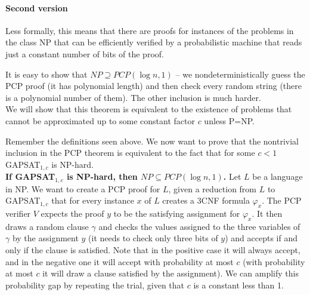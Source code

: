 \paragraph{Second version}

Less formally, this means that there are proofs for instances of the problems in the class NP that can be efficiently verified by a probabilistic machine that reads just a constant number of bits of the proof. 

It is easy to show that $NP \supseteq PCP(\log n, 1)$ -- we nondeterministically guess the PCP proof (it has polynomial length) and then check every random string (there is a polynomial number of them). The other inclusion is much harder.
\\

We will show that this theorem is equivalent to the existence of problems that cannot be approximated up to some constant factor $c$ unless P=NP.

Remember the definitions seen above. We now want to prove that the nontrivial inclusion in the PCP theorem is equivalent to the fact that for some $c<1$ GAPSAT$_{1,c}$ is NP-hard.
\\

{\bf If GAPSAT$_{1,c}$ is NP-hard, then $NP \subseteq PCP(\log n, 1)$.} Let $L$ be a language in NP. We want to create a PCP proof for $L$, given a reduction from $L$ to GAPSAT$_{1,c}$ that for every instance $x$ of $L$ creates a 3CNF formula $\varphi_x$. The PCP verifier $V$ expects the proof $y$ to be the satisfying assignment for $\varphi_x$. It then draws a random clause $\gamma$ and checks the values assigned to the three variables of $\gamma$ by the assignment $y$ (it needs to check only three bits of $y$) and accepts if and only if the clause is satisfied. Note that in the positive case it will always accept, and in the negative one it will accept with probability at most $c$ (with probability at most $c$ it will draw a clause satisfied by the assignment). We can amplify this probability gap by repeating the trial, given that $c$ is a constant less than 1.
\\


